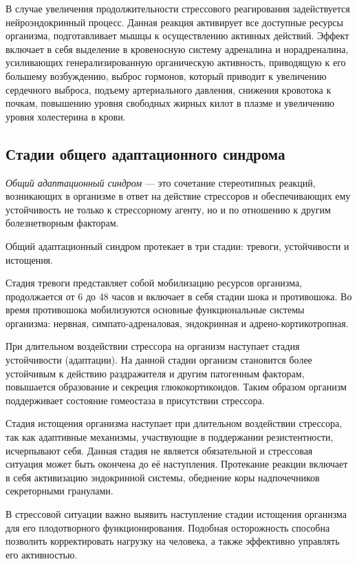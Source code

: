 В случае увеличения продолжительности стрессового реагирования задействуется нейроэндокринный процесс. Данная реакция активирует все доступные ресурсы организма, подготавливает мышцы к осуществлению активных действий. Эффект включает в себя выделение в кровеносную систему адреналина и норадреналина, усиливающих генерализированную органическую активность, приводящую к его большему возбуждению, выброс гормонов, который приводит к увеличению сердечного выброса, подъему артериального давления, снижения кровотока к почкам, повышению уровня свободных жирных килот в плазме и увеличению уровня холестерина в крови. \cite{neuroPhysicalMechasmsOfStress}

\subsection{Стадии общего адаптационного синдрома}

\textit{Общий адаптационный синдром} --- это сочетание стереотипных реакций, возникающих в организме в ответ на действие стрессоров и обеспечивающих ему устойчивость не только к стрессорному агенту, но и по отношению к другим болезнетворным факторам. \cite{stressAndPatology}

Общий адаптационный синдром протекает в три стадии: тревоги, устойчивости и истощения.

Стадия тревоги представляет собой мобилизацию ресурсов организма, продолжается от 6 до 48 часов и включает в себя стадии шока и противошока. Во время противошока мобилизуются основные функциональные системы организма: нервная, симпато-адреналовая, эндокринная и адрено-кортикотропная. \cite{stressAndPatology}

При длительном воздействии стрессора на организм наступает стадия устойчивости (адаптации). На данной стадии организм становится более устойчивым к действию раздражителя и другим патогенным факторам, повышается образование и секреция глюкокортикоидов. Таким образом организм поддерживает состояние гомеостаза в присутствии стрессора. \cite{stressAndPatology}

Стадия истощения организма наступает при длительном воздействии стрессора, так как адаптивные механизмы, участвующие в поддержании резистентности, исчерпывают себя. Данная стадия не является обязательной и стрессовая ситуация может быть окончена до её наступления. Протекание реакции включает в себя активизацию эндокринной системы, обеднение коры надпочечников секреторными гранулами. \cite{stressAndPatology}

В стрессовой ситуации важно выявить наступление стадии истощения организма для его плодотворного функционирования. Подобная осторожность способна позволить корректировать нагрузку на человека, а также эффективно управлять его активностью.

